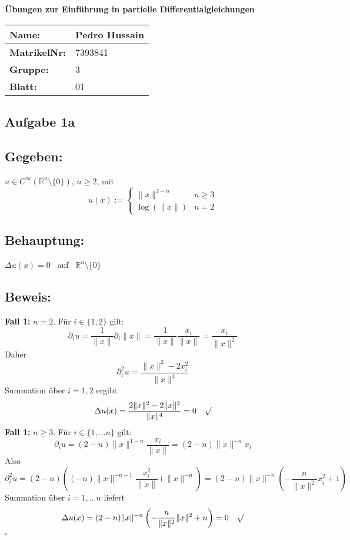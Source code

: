 \documentclass[a4paper, 12pt]{article} %
\newcommand{\makemyblock}[3]{

    \begin{center}
        \Large \textbf{#1} \normalsize
    \end{center}

    \vspace{1cm}

    \begin{flushleft}        
        \begin{tabular}{|l|l|}
            \hline
            \textbf{Name:}       & Pedro Hussain \\
            \hline
            \textbf{MatrikelNr:} & 7393841 \\
            \hline
            \textbf{Gruppe:}     & {#2} \\
            \hline
            \textbf{Blatt:}      & {#3} \\
            \hline
        \end{tabular}
    \end{flushleft}

    \newcommand*{\QEDA}{\null\nobreak\hfill\ensuremath{\blacksquare}}%
    \newcommand*{\QEDB}{\null\nobreak\hfill\ensuremath{\square}}%

}
\begin{document}
    \makemyblock{Übungen zur Einführung in partielle Differentialgleichungen}
                {3}{01}
    \vspace{1cm}

    \begin{flushleft}

        \section*{Aufgabe 1a}

        \subsection*{Gegeben:}
        $u \in C^{\infty}(\mathbb{R}^n\setminus\{0\}) $, $n\ge 2$, mit
        $$
        u(x) := \begin{cases}
                    \|x\|^{2-n} & n\ge 3 \\
                    \log(\|x\|) & n=2
                \end{cases}
        $$

        \subsection*{Behauptung:}
        $\Delta u(x) = 0$ \, auf \, $\mathbb{R}^n\setminus\{0\}$

        \subsection*{Beweis:}
        \textbf{Fall 1:} $n = 2$.
        Für $i \in \{1,2\}$ gilt:
        $$
        \partial_i u = \frac{1}{\|x\|} \partial_i \|x\| 
                     = \frac{1}{\|x\|} \frac{x_i}{\|x\|}
                     = \frac{x_i}{\|x\|^2}
        $$
        Daher
        $$
        \partial^2_i u = \frac{\|x\|^2-2x^2_i}{\|x\|^4}
        $$
        Summation über $i=1,2$ ergibt
        $$
        \Delta u(x) = \frac{2\|x\|^2 - 2\|x\|^2}{\|x\|^4} 
                    = 0 \quad \surd
        $$
        \textbf{Fall 1:} $n \ge 3$.
        Für $i \in \{1,...n\}$ gilt:    
        $$
        \partial_i u = (2-n)\|x\|^{1-n}\frac{x_i}{\|x\|}
                     = (2-n)\|x\|^{-n}x_i
        $$
        Also
        $$
        \partial^2_i u = (2-n) \left ((-n)\|x\|^{-n-1}\frac{x^2_i}{\|x\|}+\|x\|^{-n} \right )
                       = (2-n) \|x\|^{-n} \left ( -\frac{n}{\|x\|^2} x^2_i + 1 \right )
        $$
        Summation über $i=1,...n$ liefert
        $$
        \Delta u(x) = (2-n) \|x\|^{-n} \left ( -\frac{n}{\|x\|^2} \|x\|^2 + n \right )
                    = 0  \quad \surd
        $$
        \QEDB



\end{flushleft}
\end{document}
